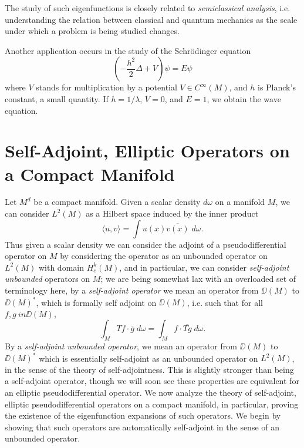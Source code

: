The study of such eigenfunctions is closely related to \emph{semiclassical analysis}, i.e. understanding the relation between classical and quantum mechanics as the scale under which a problem is being studied changes.

Another application occurs in the study of the Schr\"{o}dinger equation
%
\[ \left( - \frac{h^2}{2} \Delta + V \right) \psi = E \psi \]
%
where $V$ stands for multiplication by a potential $V \in C^\infty(M)$, and $h$ is Planck's constant, a small quantity. If $h = 1/\lambda$, $V = 0$, and $E = 1$, we obtain the wave equation.








\chapter{Self-Adjoint, Elliptic Operators on a Compact Manifold}

Let $M^d$ be a compact manifold. Given a scalar density $d\omega$ on a manifold $M$, we can consider $L^2(M)$ as a Hilbert space induced by the inner product
%
\[ \langle u, v \rangle = \int u(x) \overline{v(x)}\; d\omega. \]
%
Thus given a scalar density we can consider the adjoint of a pseudodifferential operator on $M$ by considering the operator as an unbounded operator on $L^2(M)$ with domain $H^k_c(M)$, and in particular, we can consider \emph{self-adjoint unbounded} operators on $M$; we are being somewhat lax with an overloaded set of terminology here, by a \emph{self-adjoint operator} we mean an operator from $\DD(M)$ to $\DD(M)^*$, which is formally self adjoint on $\DD(M)$, i.e. such that for all $f,g\ in \DD(M)$,
%
\[ \int_M Tf \cdot \overline{g}\; d\omega = \int_M f \cdot \overline{Tg}\; d\omega. \]
%
By a \emph{self-adjoint unbounded operator}, we mean an operator from $\DD(M)$ to $\DD(M)^*$ which is essentially self-adjoint as an unbounded operator on $L^2(M)$, in the sense of the theory of self-adjointness. This is slightly stronger than being a self-adjoint operator, though we will soon see these properties are equivalent for an elliptic pseudodifferential operator. We now analyze the theory of self-adjoint, elliptic pseudodifferential operators on a compact manifold, in particular, proving the existence of the eigenfunction expansions of such operators. We begin by showing that such operators are automatically self-adjoint in the sense of an unbounded operator.

